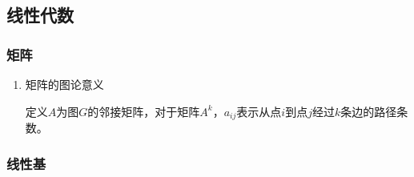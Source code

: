 \documentclass[11pt]{article}
\begin{document}
\subsection{线性代数}
\label{sec:org49c3835}
\subsubsection{矩阵}
\label{sec:orge7211d3}
\begin{enumerate}
\item 矩阵的图论意义
\label{sec:org9d29c66}

定义\(A\)为图\(G\)的邻接矩阵，对于矩阵\(A^k\)，\(a_{ij}\)表示从点\(i\)到点\(j\)经过\(k\)条边的路径条数。
\end{enumerate}

\subsubsection{线性基}
\label{sec:orgcef9c53}
\end{document}
